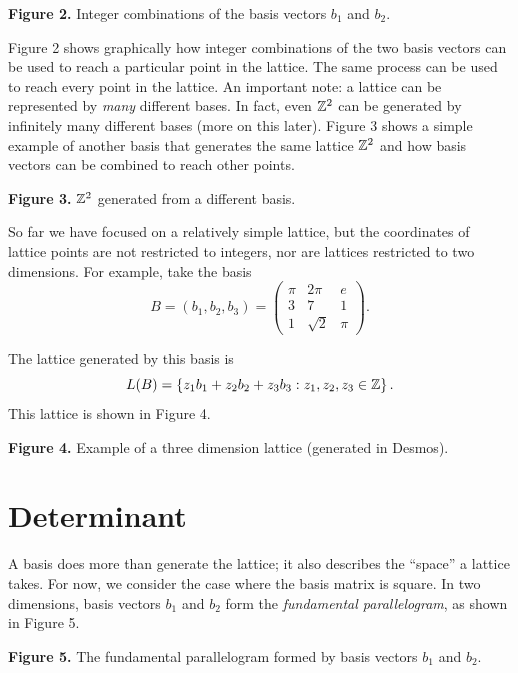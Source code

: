 \documentclass{article}
\begin{document}
{\textbf{Figure 2.} Integer combinations of the basis vectors \(b_1\) and \(b_2\).}

Figure 2 shows graphically how integer combinations of the two basis vectors can be used to reach a particular point in the lattice. 
The same process can be used to reach every point in the lattice.
An important note: a lattice can be represented by \emph{many} different bases.
In fact, even $\mathbb{Z}^2$ can be generated by infinitely many different bases (more on this later).
Figure 3 shows a simple example of another basis that generates the same lattice $\mathbb{Z}^2$ and how basis vectors can be combined to reach other points.

{\textbf{Figure 3.} $\mathbb{Z}^2$ generated from a different basis.}

So far we have focused on a relatively simple lattice, but the coordinates of lattice points are not restricted to integers, nor are lattices restricted to two dimensions.
For example, take the basis
\[
B
=
(b_1, b_2, b_3)
=
\begin{pmatrix}
\pi & 2\pi & e\\
3 & 7 & 1\\
1 & \sqrt{2} & \pi
\end{pmatrix}.
\]


The lattice generated by this basis is
\[
L(B)
=
\left\{
z_1 b_1 + z_2 b_2 + z_3 b_3
:
z_1,z_2,z_3\in\mathbb{Z}
\right\}.
\]
This lattice is shown in
Figure 4.

{\textbf{Figure 4.} Example of a three dimension lattice (generated in Desmos).}










\section{Determinant}
A basis does more than generate the lattice; it also describes the ``space'' a lattice takes.
For now, we consider the case where the basis matrix is square.
In two dimensions, basis vectors $b_1$ and $b_2$ form the \emph{fundamental parallelogram}, as shown in Figure 5.

{\textbf{Figure 5.} The fundamental parallelogram formed by basis vectors $b_1$ and $b_2$.}
\end{document}
